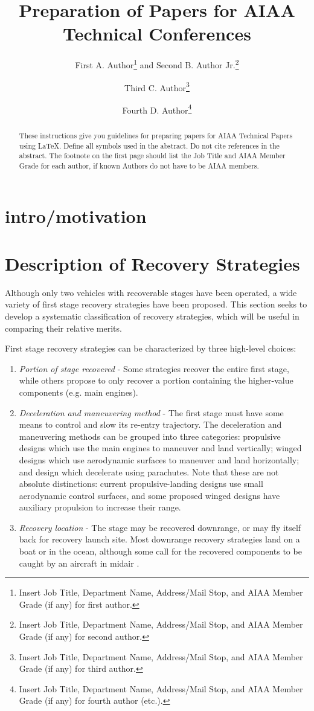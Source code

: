 \documentclass[conf]{new-aiaa}
\title{Preparation of Papers for AIAA Technical Conferences}
\author{First A. Author\footnote{Insert Job Title, Department Name, Address/Mail Stop, and AIAA Member Grade (if any) for first author.} and Second B. Author Jr.\footnote{Insert Job Title, Department Name, Address/Mail Stop, and AIAA Member Grade (if any) for second author.}}
\affil{Business or Academic Affiliation 1, City, State, Zip Code}
\author{Third C. Author\footnote{Insert Job Title, Department Name, Address/Mail Stop, and AIAA Member Grade (if any) for third author.}}
\affil{Business or Academic Affiliation 2, City, Province, Zip Code, Country}
\author{Fourth D. Author\footnote{Insert Job Title, Department Name, Address/Mail Stop, and AIAA Member Grade (if any) for fourth author (etc.).}}
\affil{Business or Academic Affiliation 2, City, State, Zip Code}
\begin{document}
\maketitle

\begin{abstract}
These instructions give you guidelines for preparing papers for AIAA Technical Papers using \LaTeX{}. Define all symbols used in the abstract. Do not cite references in the abstract. The footnote on the first page should list the Job Title and AIAA Member Grade for each author, if known Authors do not have to be AIAA members.
\end{abstract}

\section{intro/motivation}

\section{Description of Recovery Strategies}
Although only two vehicles with recoverable stages have been operated, a wide variety of first stage recovery strategies have been proposed. This section seeks to develop a systematic classification of recovery strategies, which will be useful in comparing their relative merits.

First stage recovery strategies can be characterized by three high-level choices:
\begin{enumerate}
	\item \textit{Portion of stage recovered} - Some strategies recover the entire first stage, while others propose to only recover a portion containing the higher-value components (e.g. main engines).
	\item \textit{Deceleration and maneuvering method} - The first stage must have some means to control and slow its re-entry trajectory. The deceleration and maneuvering methods can be grouped into three categories: propulsive designs which use the main engines to maneuver and land vertically; winged designs which use aerodynamic surfaces to maneuver and land horizontally; and design which decelerate using parachutes. Note that these are not absolute distinctions: current propulsive-landing designs use small aerodynamic control surfaces, and some proposed winged designs have auxiliary propulsion to increase their range.
	\item \textit{Recovery location} - The stage may be recovered downrange, or may fly itself back for recovery launch site. Most downrange recovery strategies land on a boat or in the ocean, although some call for the recovered components to be caught by an aircraft in midair \cite{Ragab2015}.
\end{enumerate}
\end{document}
